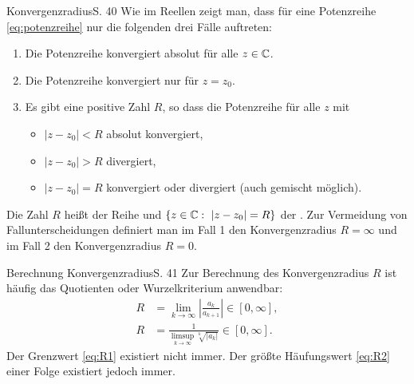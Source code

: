 \begin{bemerkung}{Konvergenzradius}{S. 40}
  Wie im Reellen zeigt man, dass für eine Potenzreihe \eqref{eq:potenzreihe} nur die folgenden drei Fälle auftreten:
  \begin{enumerate}
    \item Die Potenzreihe konvergiert absolut für alle $z \in \mathbb{C}$.
    \item Die Potenzreihe konvergiert nur für $z = z_0$.
    \item Es gibt eine positive Zahl $R$, so dass die Potenzreihe für alle $z$ mit
      \begin{itemize}
        \item $|z - z_0| < R$ absolut konvergiert,
        \item $|z - z_0| > R$ divergiert,
        \item $|z - z_0| = R$ konvergiert oder divergiert (auch gemischt möglich).
      \end{itemize}
  \end{enumerate}
  Die Zahl $R$ heißt  der Reihe und $\{ z \in \mathbb{C} : \ |z - z_0| = R \}$ der .
  Zur Vermeidung von Fallunterscheidungen definiert man im Fall 1 den Konvergenzradius $R = \infty$ und im Fall 2 den Konvergenzradius $R = 0$.
\end{bemerkung}

\begin{bemerkung}{Berechnung Konvergenzradius}{S. 41}
  Zur Berechnung des Konvergenzradius $R$ ist häufig das Quotienten oder Wurzelkriterium anwendbar:
  \begin{align}
    R &= \lim_{k \to \infty} \left| \frac{a_k}{a_{k+1}} \right| \in [0, \infty],\label{eq:R1}\\
    R &= \frac{1}{\displaystyle \limsup_{k \to \infty} \sqrt[k]{\left| a_k \right|}} \in [0, \infty].\label{eq:R2}
  \end{align}
  Der Grenzwert \eqref{eq:R1} existiert nicht immer.
  Der größte Häufungswert \eqref{eq:R2} einer Folge existiert jedoch immer.
\end{bemerkung}



